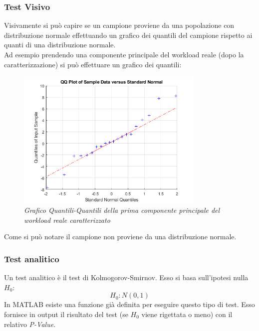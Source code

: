 \subsubsection{Test Visivo}
Visivamente si può capire se un campione proviene da una popolazione con distribuzione normale effettuando un grafico dei quantili del campione rispetto ai quanti di una distribuzione normale.
\\Ad esempio prendendo una componente principale del workload reale (dopo la caratterizzazione) si può effettuare un grafico dei quantili:
\begin{figure}[H]
	\centering
	\includegraphics[width=0.8\textwidth]{img/hw3/test_visivo.png}
	\caption{\textit{Grafico Quantili-Quantili della prima componente principale del workload reale caratterizzato}}
\end{figure}
Come si può notare il campione non proviene da una distribuzione normale.
\subsubsection{Test analitico}
Un test analitico è il test di Kolmogorov-Smirnov. Esso si basa sull'ipotesi nulla $H_0$:
\begin{equation*}
	H_0 : N(0,1) 
\end{equation*}
In MATLAB esiste una funzione già definita per eseguire questo tipo di test. Esso fornisce in output il risultato del test (se $H_0$ viene rigettata o meno) con il relativo \textit{P-Value}.